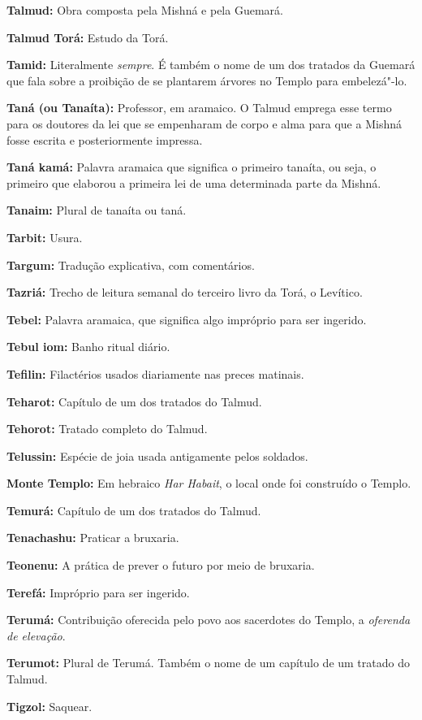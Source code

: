 \begin{hangparas}{.25in}{1}
{\textbf{Talmud:} Obra composta pela Mishná e pela Guemará.

\textbf{Talmud Torá:} Estudo da Torá.

\textbf{Tamid:} Literalmente \emph{sempre}. É também o nome de um dos tratados 
da Guemará que fala sobre a proibição de se plantarem árvores no Templo para
embelezá"-lo.

\textbf{Taná (ou Tanaíta):} Professor, em aramaico. O Talmud emprega 
esse termo para os doutores da lei que se
empenharam de corpo e alma para que a Mishná fosse escrita e
posteriormente impressa.

\textbf{Taná kamá:} Palavra aramaica que significa o primeiro tanaíta,
ou seja, o primeiro que elaborou a primeira lei de uma determinada
parte da Mishná.

\textbf{Tanaim:} Plural de tanaíta ou taná.

\textbf{Tarbit:} Usura.

\textbf{Targum:} Tradução explicativa, com comentários.

\textbf{Tazriá:} Trecho de leitura semanal do terceiro livro da Torá, o Levítico.

\textbf{Tebel:} Palavra aramaica, que significa algo
impróprio para ser ingerido.

\textbf{Tebul iom:} Banho ritual diário.

\textbf{Tefilin:} Filactérios usados diariamente nas preces matinais.

\textbf{Teharot:} Capítulo de um dos tratados do Talmud.

\textbf{Tehorot:} Tratado completo do Talmud.

\textbf{Telussin:} Espécie de joia usada antigamente pelos soldados.

\textbf{Monte Templo:} Em hebraico \emph{Har Habait}, 
o local onde foi construído o Templo.

\textbf{Temurá:} Capítulo de um dos tratados do Talmud.

\textbf{Tenachashu:} Praticar a bruxaria.

\textbf{Teonenu:} A prática de prever o futuro por meio de bruxaria.

\textbf{Terefá:} Impróprio para ser ingerido.

\textbf{Terumá:} Contribuição oferecida pelo povo aos sacerdotes do Templo, a \emph{oferenda de elevação}.

\textbf{Terumot:} Plural de Terumá. Também o nome de um capítulo 
de um tratado do Talmud.

\textbf{Tigzol:} Saquear.

}
\end{hangparas}

